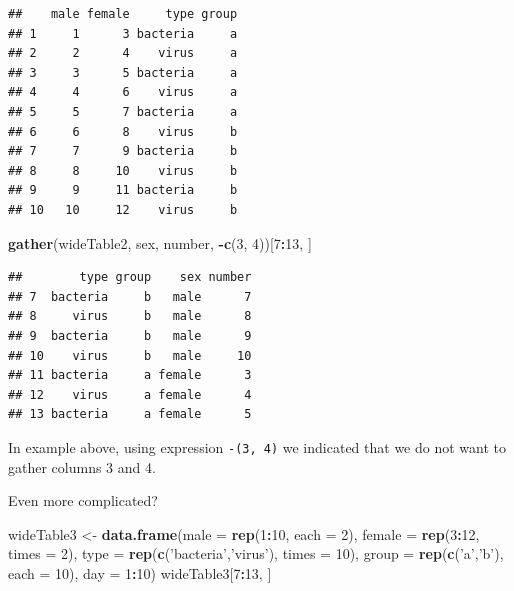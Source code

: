 \documentclass[]{book}
\newenvironment{Shaded}{\begin{snugshade}}{\end{snugshade}}
\newcommand{\KeywordTok}[1]{\textcolor[rgb]{0.13,0.29,0.53}{\textbf{#1}}}
\newcommand{\DataTypeTok}[1]{\textcolor[rgb]{0.13,0.29,0.53}{#1}}
\newcommand{\DecValTok}[1]{\textcolor[rgb]{0.00,0.00,0.81}{#1}}
\newcommand{\StringTok}[1]{\textcolor[rgb]{0.31,0.60,0.02}{#1}}
\newcommand{\OperatorTok}[1]{\textcolor[rgb]{0.81,0.36,0.00}{\textbf{#1}}}
\newcommand{\NormalTok}[1]{#1}
\theoremstyle{definition}
\theoremstyle{definition}
\theoremstyle{definition}
\theoremstyle{remark}
\begin{document}
\begin{verbatim}
##    male female     type group
## 1     1      3 bacteria     a
## 2     2      4    virus     a
## 3     3      5 bacteria     a
## 4     4      6    virus     a
## 5     5      7 bacteria     a
## 6     6      8    virus     b
## 7     7      9 bacteria     b
## 8     8     10    virus     b
## 9     9     11 bacteria     b
## 10   10     12    virus     b
\end{verbatim}

\begin{Shaded}
\begin{Highlighting}[]
\KeywordTok{gather}\NormalTok{(wideTable2, sex, number, }\OperatorTok{-}\KeywordTok{c}\NormalTok{(}\DecValTok{3}\NormalTok{, }\DecValTok{4}\NormalTok{))[}\DecValTok{7}\OperatorTok{:}\DecValTok{13}\NormalTok{, ]}
\end{Highlighting}
\end{Shaded}

\begin{verbatim}
##        type group    sex number
## 7  bacteria     b   male      7
## 8     virus     b   male      8
## 9  bacteria     b   male      9
## 10    virus     b   male     10
## 11 bacteria     a female      3
## 12    virus     a female      4
## 13 bacteria     a female      5
\end{verbatim}

In example above, using expression \texttt{-(3,\ 4)} we indicated that
we do not want to gather columns 3 and 4.

Even more complicated?

\begin{Shaded}
\begin{Highlighting}[]
\NormalTok{wideTable3 <-}\StringTok{ }\KeywordTok{data.frame}\NormalTok{(}\DataTypeTok{male =} \KeywordTok{rep}\NormalTok{(}\DecValTok{1}\OperatorTok{:}\DecValTok{10}\NormalTok{, }\DataTypeTok{each =} \DecValTok{2}\NormalTok{),}
                         \DataTypeTok{female =} \KeywordTok{rep}\NormalTok{(}\DecValTok{3}\OperatorTok{:}\DecValTok{12}\NormalTok{, }\DataTypeTok{times =} \DecValTok{2}\NormalTok{), }
                         \DataTypeTok{type =} \KeywordTok{rep}\NormalTok{(}\KeywordTok{c}\NormalTok{(}\StringTok{'bacteria'}\NormalTok{,}\StringTok{'virus'}\NormalTok{), }\DataTypeTok{times =} \DecValTok{10}\NormalTok{),}
                         \DataTypeTok{group =} \KeywordTok{rep}\NormalTok{(}\KeywordTok{c}\NormalTok{(}\StringTok{'a'}\NormalTok{,}\StringTok{'b'}\NormalTok{), }\DataTypeTok{each =} \DecValTok{10}\NormalTok{),}
                         \DataTypeTok{day =} \DecValTok{1}\OperatorTok{:}\DecValTok{10}\NormalTok{)}
\NormalTok{wideTable3[}\DecValTok{7}\OperatorTok{:}\DecValTok{13}\NormalTok{, ]}
\end{Highlighting}
\end{Shaded}
\end{document}
